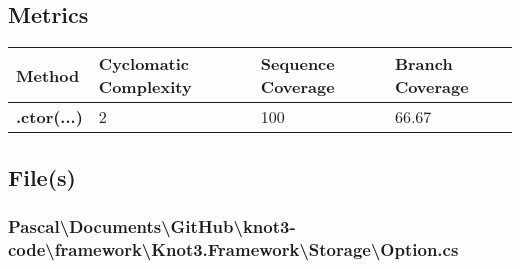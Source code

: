 \documentclass[a4paper,10pt]{article}
\begin{document}
\subsection{Metrics}
\begin{longtable}[l]{|l|l|l|l|}
\hline
\textbf{Method} & \textbf{Cyclomatic Complexity} & \textbf{Sequence Coverage} & \textbf{Branch Coverage}\\
\hline
\textbf{.ctor(...)} & 2 & 100 & 66.67\\
\hline
\end{longtable}
\subsection{File(s)}
\subsubsection{Pascal\textbackslash Documents\textbackslash GitHub\textbackslash knot3-code\textbackslash framework\textbackslash Knot3.Framework\textbackslash Storage\textbackslash Option.cs}
\end{document}
